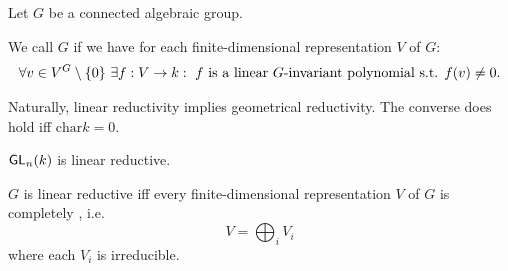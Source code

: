 \begin{definition}
	Let $G$ be a connected algebraic group.
	
	We call $G$  if we have for each finite-dimensional representation $V$ of $G$:
	\begin{align*}
	\forall v \in V^G\setminus \{0\} ~ \exists f : V \overset{}{\rightarrow} k :~ f \text{ is a linear }G\text{-invariant polynomial s.t. }f(v) \neq 0.
	\end{align*}
\end{definition}

\begin{remark}
	Naturally, linear reductivity implies geometrical reductivity.
	The converse does hold iff $\mathrm{char} k = 0$.
\end{remark}

\begin{remark}
	$\textsf{GL}_n(k)$ is linear reductive.
\end{remark}
\begin{remark}
	$G$ is linear reductive iff every finite-dimensional representation $V$ of $G$ is completely , i.e.
	\[ V = \bigoplus_i V_i \]
	where each $V_i$ is irreducible.
\end{remark}